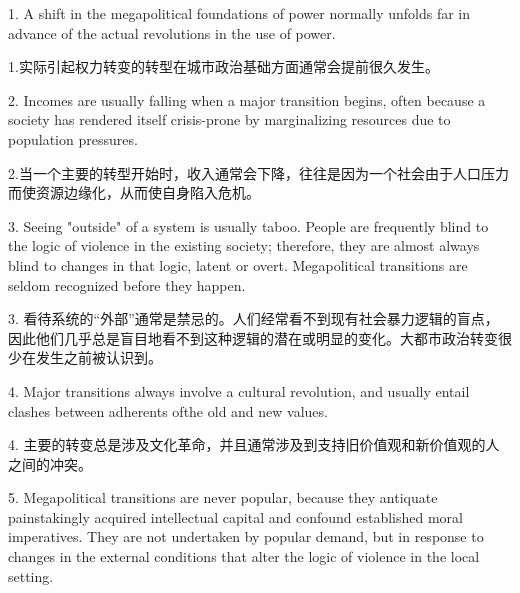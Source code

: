 \begin{paracol}{2}

\switchcolumn

\switchcolumn*
\switchcolumn
    
\switchcolumn*
\switchcolumn
    
\switchcolumn*
\switchcolumn
    
\switchcolumn*
\switchcolumn
    
    
\end{paracol}




\begin{Parallel}{97mm}{45mm}


  \ParallelLText
  {1. A shift in the megapolitical foundations of power normally unfolds far in advance of the actual revolutions in the use of power.}
  
  \ParallelRText
  {1.实际引起权力转变的转型在城市政治基础方面通常会提前很久发生。}
  \ParallelPar



  \ParallelLText
  {2. Incomes are usually falling when a major transition begins, often because a society has rendered itself crisis-prone by marginalizing resources due to population pressures.}
  
  \ParallelRText
  {2.当一个主要的转型开始时，收入通常会下降，往往是因为一个社会由于人口压力而使资源边缘化，从而使自身陷入危机。}
  \ParallelPar



  \ParallelLText
  {3. Seeing "outside" of a system is usually taboo. People are frequently blind to the logic of violence in the existing society; therefore, they are almost always blind to changes in that logic, latent or overt. Megapolitical transitions are seldom recognized before they happen.}
  
  \ParallelRText
  {3. 看待系统的“外部”通常是禁忌的。人们经常看不到现有社会暴力逻辑的盲点，因此他们几乎总是盲目地看不到这种逻辑的潜在或明显的变化。大都市政治转变很少在发生之前被认识到。}
  \ParallelPar



  \ParallelLText
  {4. Major transitions always involve a cultural revolution, and usually entail clashes between adherents ofthe old and new values.}
  
  \ParallelRText
  {4. 主要的转变总是涉及文化革命，并且通常涉及到支持旧价值观和新价值观的人之间的冲突。}
  \ParallelPar



  \ParallelLText
  {5. Megapolitical transitions are never popular, because they antiquate painstakingly acquired intellectual capital and confound established moral imperatives. They are not undertaken by popular demand, but in response to changes in the external conditions that alter the logic of violence in the local setting.}
  

\end{Parallel}

